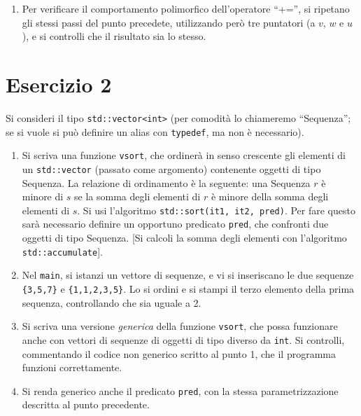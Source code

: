 \documentclass[12pt]{article}
\begin{document}
\begin{enumerate}
\item
Per verificare il comportamento polimorfico dell'operatore ``+='',
si ripetano gli stessi passi del punto precedete, utilizzando per\`o tre puntatori
(a $v$, $w$ e $u$), e si controlli che il risultato sia lo stesso.


\end{enumerate}



\section*{Esercizio 2}


Si consideri il tipo {\tt std::vector<int>}
(per comodit\`a lo chiameremo ``Sequenza'';
se si vuole si pu\`o definire un alias con {\tt typedef},
ma non \`e necessario).

\begin{enumerate}

\item
Si scriva una funzione {\tt vsort}, che ordiner\`a in senso crescente gli elementi di
un {\tt std::vector} (passato come argomento) contenente oggetti di tipo Sequenza.
La relazione di ordinamento \`e la seguente: una Sequenza $r$ \`e
minore di $s$ se la somma degli elementi di $r$ \`e minore della somma degli elementi di $s$.
Si usi l'algoritmo {\tt std::sort(it1, it2, pred)}.
Per fare questo sar\`a necessario definire un opportuno predicato {\tt pred},
che confronti due oggetti di tipo Sequenza.
[Si calcoli la somma degli elementi con l'algoritmo {\tt std::accumulate}].

\item
Nel {\tt main}, si istanzi un vettore di sequenze, e vi si inseriscano le due sequenze
{\tt \{3,5,7\}} e {\tt \{1,1,2,3,5\}}.
Lo si ordini e si stampi il terzo elemento della prima sequenza, controllando che sia uguale a 2.

\item
Si scriva una versione {\it generica} della funzione {\tt vsort},
che possa funzionare anche con vettori di sequenze di oggetti di tipo diverso da {\tt int}.
Si controlli, commentando il codice non generico scritto al punto 1, che
il programma funzioni correttamente.

\item
Si renda generico anche il predicato {\tt pred}, con la stessa parametrizzazione descritta al punto precedente.


\end{enumerate}
\end{document}
